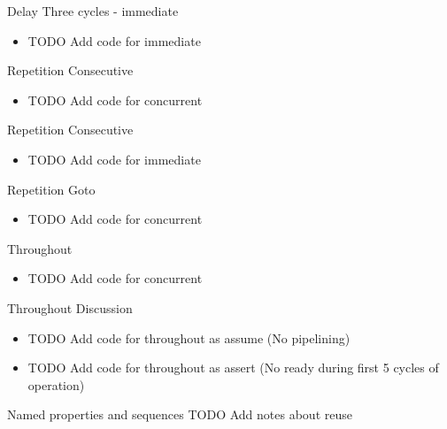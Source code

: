 \documentclass{beamer}
\begin{document}
\begin{frame}{Delay}
Three cycles - immediate

\begin{itemize}
 \item TODO Add code for immediate
\end{itemize}
\end{frame}


\begin{frame}{Repetition}
Consecutive

\begin{itemize}
 \item TODO Add code for concurrent
\end{itemize}
\end{frame}


\begin{frame}{Repetition}
Consecutive

\begin{itemize}
 \item TODO Add code for immediate
\end{itemize}
\end{frame}


\begin{frame}{Repetition}
Goto

\begin{itemize}
 \item TODO Add code for concurrent
\end{itemize}
\end{frame}


\begin{frame}{Throughout}
\begin{itemize}
 \item TODO Add code for concurrent
\end{itemize}
\end{frame}


\begin{frame}{Throughout}
Discussion
\begin{itemize}
 \item TODO Add code for throughout as assume (No pipelining)
 \item TODO Add code for throughout as assert (No ready during first 5 cycles of operation)
\end{itemize}
\end{frame}


\begin{frame}{Named properties and sequences}
TODO Add notes about reuse
\end{frame}
\end{document}
